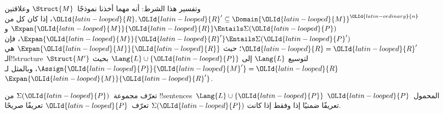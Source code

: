 \documentclass[../../../include/open-logic-section]{subfiles}
\begin{document}
وتفسير هذا الشرط: أنه مهما أخذنا نموذجًا~$\Struct{M}$ وعلاقتين
$\OLId{latin-looped}{R},\OLId{latin-looped}{R}' \subseteq \Domain{\OLId{latin-looped}{M}}^\OLId{latin-ordinary}{n}$، إذا كان كل من
$\Expan{\OLId{latin-looped}{M}}{\OLId{latin-looped}{R}} \Entails \Sigma(\OLId{latin-looped}{P})$ و
$\Expan{\OLId{latin-looped}{M}}{\OLId{latin-looped}{R}'} \Entails \Sigma(\OLId{latin-looped}{P}')$، فإن $\OLId{latin-looped}{R}=\OLId{latin-looped}{R}'$؛ حيث
$\Expan{\OLId{latin-looped}{M}}{\OLId{latin-looped}{R}}$ هي الـ!!{structure}~$\Struct{M'}$ لتوسيع $\Lang{L}$
إلى $\Lang{L} \cup \{\OLId{latin-looped}{P}\}$ بحيث $\Assign{\OLId{latin-looped}{P}}{\OLId{latin-looped}{M}'}=\OLId{latin-looped}{R}$، وبالمثل لـ
$\Expan{\OLId{latin-looped}{M}}{\OLId{latin-looped}{R}'}$.

\begin{thm}
تعرّف مجموعة~$\Sigma(\OLId{latin-looped}{P})$ من !!{sentence}s~$\Lang{L} \cup \{\OLId{latin-looped}{P}\}$
المحمول~$\OLId{latin-looped}{P}$ تعريفًا ضمنيًا إذا وفقط إذا كانت $\Sigma(\OLId{latin-looped}{P})$ تعرّف~$\OLId{latin-looped}{P}$
تعريفًا صريحًا.
\end{thm}
\end{document}
